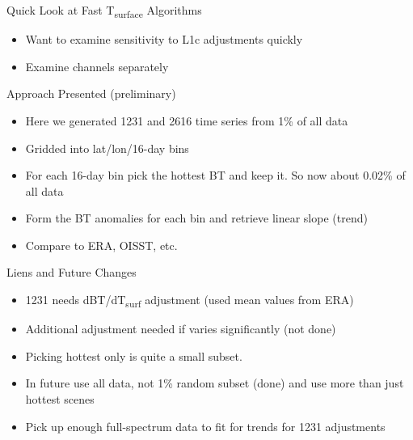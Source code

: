 \documentclass[10pt,t]{beamer}
\begin{document}
\begin{frame}[label={sec:org3ee2f9f},shrink=20]{Quick Look at Fast T\textsubscript{surface} Algorithms}
\begin{itemize}
\item Want to examine sensitivity to L1c adjustments \alert{quickly}
\item Examine channels separately
\end{itemize}

\begin{block}{Approach Presented (preliminary)}
\begin{itemize}
\item Here we generated 1231 and 2616 \wn time series from 1\% of all data
\item Gridded into lat/lon/16-day bins
\item For each 16-day bin pick the hottest BT and keep it.  So now about 0.02\% of all data
\item Form the BT anomalies for each bin and retrieve linear slope (trend)
\item Compare to ERA, OISST, etc.
\end{itemize}
\end{block}

\begin{block}{Liens and Future Changes}
\begin{itemize}
\item 1231 \wn needs dBT/dT\textsubscript{surf} adjustment (used mean values from ERA)
\item Additional adjustment needed if \water varies significantly (not done)
\item Picking hottest only is quite a small subset.
\item In future use all data, not 1\% random subset (done) and use more than just hottest scenes
\item Pick up enough full-spectrum data to fit for \water trends for 1231 \wn adjustments
\end{itemize}
\end{block}
\end{frame}
\end{document}
